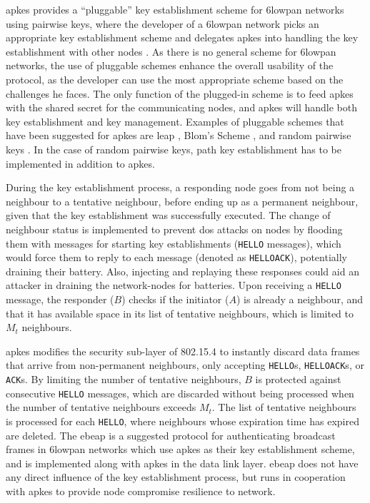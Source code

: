 \gls{apkes} provides a ``pluggable'' key establishment scheme for \gls{6lowpan} networks using pairwise keys, where the developer of a \gls{6lowpan} network picks an appropriate key establishment scheme and delegates \gls{apkes} into handling the key establishment with other nodes \cite{krentz20136lowpan}. As there is no general scheme for \gls{6lowpan} networks, the use of pluggable schemes enhance the overall usability of the protocol, as the developer can use the most appropriate scheme based on the challenges he faces. The only function of the plugged-in scheme is to feed \gls{apkes} with the shared secret for the communicating nodes, and \gls{apkes} will handle both key establishment and key management. Examples of pluggable schemes that have been suggested for \gls{apkes} are \gls{leap} \cite{zhu2006leap+}, Blom's Scheme \cite{blom1984optimal}, and random pairwise keys \cite{chan2003random}. In the case of random pairwise keys, path key establishment has to be implemented in addition to \gls{apkes}.

During the key establishment process, a responding node goes from not being a neighbour to a tentative neighbour, before ending up as a permanent neighbour, given that the key establishment was successfully executed. The change of neighbour status is implemented to prevent \gls{dos} attacks on nodes by flooding them with messages for starting key establishments (\texttt{HELLO} messages), which would force them to reply to each message (denoted as \texttt{HELLOACK}), potentially draining their battery. Also, injecting and replaying these responses could aid an attacker in draining the network-nodes for batteries. Upon receiving a \texttt{HELLO} message, the responder ($B$) checks if the initiator ($A$) is already a neighbour, and that it has available space in its list of tentative neighbours, which is limited to $M_t$ neighbours. 

\gls{apkes} modifies the security sub-layer of 802.15.4 to instantly discard data frames that arrive from non-permanent neighbours, only accepting \texttt{HELLO}s, \texttt{HELLOACK}s, or \texttt{ACK}s. By limiting the number of tentative neighbours, $B$ is protected against consecutive \texttt{HELLO} messages, which are discarded without being processed when the number of tentative neighbours exceeds $M_t$. The list of tentative neighbours is processed for each \texttt{HELLO}, where neighbours whose expiration time has expired are deleted. The \gls{ebeap} is a suggested protocol for authenticating broadcast frames in \gls{6lowpan} networks which use \gls{apkes} as their key establishment scheme, and is implemented along with \gls{apkes} in the data link layer. \gls{ebeap} does not have any direct influence of the key establishment process, but runs in cooperation with \gls{apkes} to provide node compromise resilience to network. 

